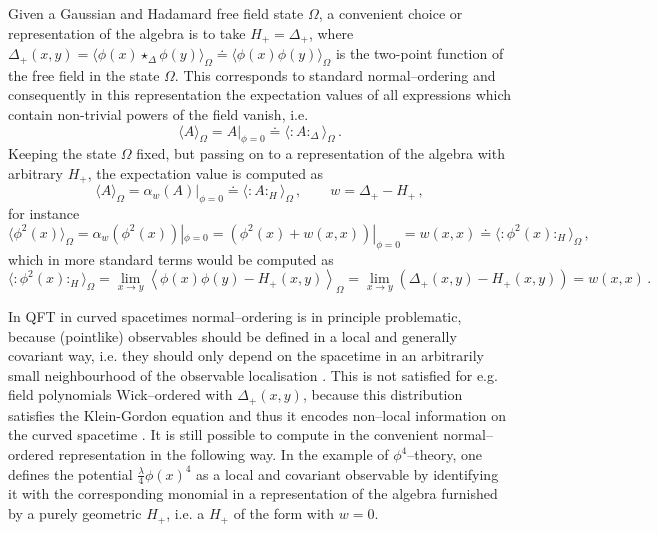 \documentclass[10pt]{book}
\newcommand{\wick}[1]{:\!{#1}\!:}
\theoremstyle{break}
\begin{document}
Given a Gaussian and Hadamard free field state $\Omega$, a convenient choice or representation of the algebra is to take $H_+=\Delta_+$, where $\Delta_+(x,y)=\langle \phi(x)\star_\Delta\phi(y)\rangle_\Omega\doteq\langle \phi(x)\phi(y)\rangle_\Omega$ is the two-point function of the free field in the state $\Omega$. This corresponds to standard normal--ordering and consequently in this  representation the expectation values of all expressions which contain non-trivial powers of the field vanish, i.e.
\begin{equation} \langle A\rangle_\Omega = A|_{\phi=0}\doteq \langle \wick{A}_\Delta\rangle_\Omega\,.\end{equation}
Keeping the state $\Omega$ fixed, but passing on to a representation of the algebra with arbitrary $H_+$, the expectation value is computed as
$$ \langle A\rangle_\Omega = \alpha_w(A)|_{\phi=0}\doteq \langle \wick{A}_H\rangle_\Omega\,, \qquad w=\Delta_+-H_+\,,$$
for instance
$$\langle \phi^2(x)\rangle_\Omega = \alpha_w(\phi^2(x))|_{\phi=0}=\left(\phi^2(x)+w(x,x)\right)|_{\phi=0}=w(x,x)\doteq \langle \wick{\phi^2(x)}_H\rangle_\Omega \,,$$
which in more standard terms would be computed as
$$\langle \wick{\phi^2(x)}_H\rangle_\Omega =\lim_{x\to y}\left\langle \phi(x)\phi(y)-H_+(x,y)\right\rangle_\Omega=\lim_{x\to y}\left(\Delta_+(x,y)-H_+(x,y)\right)=w(x,x)\,.$$

In QFT in curved spacetimes normal--ordering is in principle problematic, because (pointlike) observables should be defined in a local and generally covariant way, i.e. they should only depend on the spacetime in an arbitrarily small neighbourhood of the observable localisation %
. This is not satisfied for e.g. field polynomials Wick--ordered with $\Delta_+(x,y)$, because this distribution satisfies the Klein-Gordon equation and thus it encodes non--local information on the curved spacetime %
. It is still possible to compute in the convenient normal--ordered representation in the following way. In the example of $\phi^4$--theory, one defines the potential $\frac{\lambda}{4} \phi(x)^4$ as a local and covariant observable by identifying it with the corresponding monomial in a representation of the algebra furnished by a purely geometric $H_+$, i.e. a $H_+$ of the form %
with $w=0$.
\end{document}
